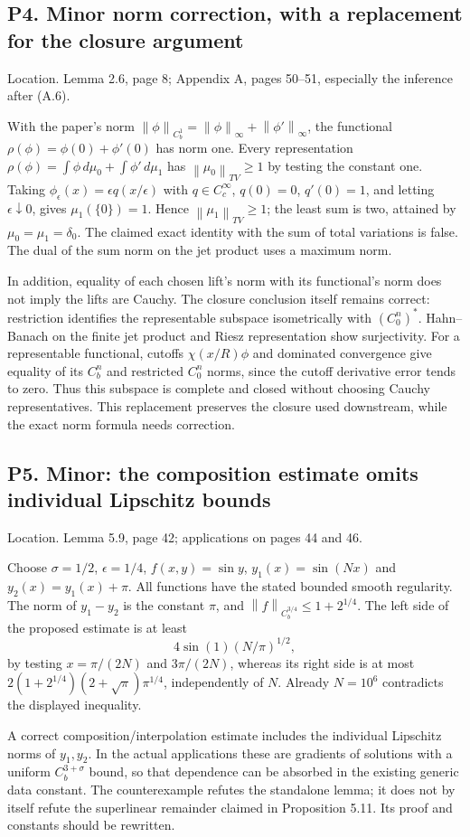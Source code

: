 \documentclass[10pt]{article}
\begin{document}
\subsection*{P4. Minor norm correction, with a replacement for the closure argument}
Location. Lemma 2.6, page 8; Appendix A, pages 50–51, especially the inference after (A.6).\par
With the paper’s norm \(\left\|\phi\right\|_{C_b^1}=\left\|\phi\right\|_\infty+\left\|\phi'\right\|_\infty\), the functional \(\rho(\phi)=\phi(0)+\phi'(0)\) has norm one. Every representation \(\rho(\phi)=\int\phi\,d\mu_0+\int\phi'\,d\mu_1\) has \(\left\|\mu_0\right\|_{TV}\ge1\) by testing the constant one. Taking \(\phi_\epsilon(x)=\epsilon q(x/\epsilon)\) with \(q\in C_c^\infty\), \(q(0)=0\), \(q'(0)=1\), and letting \(\epsilon\downarrow0\), gives \(\mu_1(\{0\})=1\). Hence \(\left\|\mu_1\right\|_{TV}\ge1\); the least sum is two, attained by \(\mu_0=\mu_1=\delta_0\). The claimed exact identity with the sum of total variations is false. The dual of the sum norm on the jet product uses a maximum norm.\par
In addition, equality of each chosen lift’s norm with its functional’s norm does not imply the lifts are Cauchy. The closure conclusion itself remains correct: restriction identifies the representable subspace isometrically with \((C_0^n)^*\). Hahn–Banach on the finite jet product and Riesz representation show surjectivity. For a representable functional, cutoffs \(\chi(x/R)\phi\) and dominated convergence give equality of its \(C_b^n\) and restricted \(C_0^n\) norms, since the cutoff derivative error tends to zero. Thus this subspace is complete and closed without choosing Cauchy representatives. This replacement preserves the closure used downstream, while the exact norm formula needs correction.\par
\subsection*{P5. Minor: the composition estimate omits individual Lipschitz bounds}
Location. Lemma 5.9, page 42; applications on pages 44 and 46.\par
Choose \(\sigma=1/2\), \(\epsilon=1/4\), \(f(x,y)=\sin y\), \(y_1(x)=\sin(Nx)\) and \(y_2(x)=y_1(x)+\pi\). All functions have the stated bounded smooth regularity. The norm of \(y_1-y_2\) is the constant \(\pi\), and \(\left\|f\right\|_{C_b^{3/4}}\le1+2^{1/4}\). The left side of the proposed estimate is at least \[4\sin(1)(N/\pi)^{1/2},\] by testing \(x=\pi/(2N)\) and \(3\pi/(2N)\), whereas its right side is at most \(2(1+2^{1/4})(2+\sqrt\pi)\pi^{1/4}\), independently of \(N\). Already \(N=10^6\) contradicts the displayed inequality.\par
A correct composition/interpolation estimate includes the individual Lipschitz norms of \(y_1,y_2\). In the actual applications these are gradients of solutions with a uniform \(C_b^{3+\sigma}\) bound, so that dependence can be absorbed in the existing generic data constant. The counterexample refutes the standalone lemma; it does not by itself refute the superlinear remainder claimed in Proposition 5.11. Its proof and constants should be rewritten.\par
\end{document}
